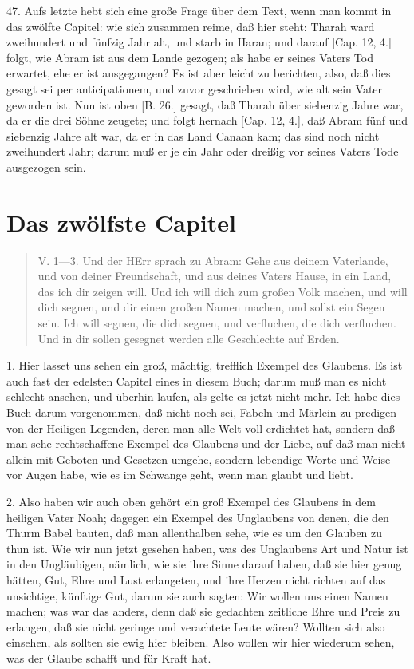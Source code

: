 47. Aufs letzte hebt sich eine große Frage über dem Text, wenn man kommt in das zwölfte Capitel: wie sich zusammen reime, daß hier steht: Tharah ward zweihundert und fünfzig Jahr alt, und starb in Haran; und darauf [Cap. 12, 4.] folgt, wie Abram ist aus dem Lande gezogen; als habe er seines Vaters Tod erwartet, ehe er ist ausgegangen? Es ist aber leicht zu berichten, also, daß dies gesagt sei per anticipationem, und zuvor geschrieben wird, wie alt sein Vater geworden ist. Nun ist oben [B. 26.] gesagt, daß Tharah über siebenzig Jahre war, da er die drei Söhne zeugete; und folgt hernach [Cap. 12, 4.], daß Abram fünf und siebenzig Jahre alt war, da er in das Land Canaan kam; das sind noch nicht zweihundert Jahr; darum muß er je ein Jahr oder dreißig vor seines Vaters Tode ausgezogen sein.

\section{Das zwölfste Capitel}

\begin{quote}
V. 1—3. Und der HErr sprach zu Abram: Gehe aus deinem Vaterlande, und von deiner Freundschaft, und aus deines Vaters Hause, in ein Land, das ich dir zeigen will. Und ich will dich zum großen Volk machen, und will dich segnen, und dir einen großen Namen machen, und sollst ein Segen sein. Ich will segnen, die dich segnen, und verfluchen, die dich verfluchen. Und in dir sollen gesegnet werden alle Geschlechte auf Erden.
\end{quote}

1. Hier lasset uns sehen ein groß, mächtig, trefflich Exempel des Glaubens. Es ist auch fast der edelsten Capitel eines in diesem Buch; darum muß man es nicht schlecht ansehen, und überhin laufen, als gelte es jetzt nicht mehr. Ich habe dies Buch darum vorgenommen, daß nicht noch sei, Fabeln und Märlein zu predigen von der Heiligen Legenden, deren man alle Welt voll erdichtet hat, sondern daß man sehe rechtschaffene Exempel des Glaubens und der Liebe, auf daß man nicht allein mit Geboten und Gesetzen umgehe, sondern lebendige Worte und Weise vor Augen habe, wie es im Schwange geht, wenn man glaubt und liebt.

2. Also haben wir auch oben gehört ein groß Exempel des Glaubens in dem heiligen Vater Noah; dagegen ein Exempel des Unglaubens von denen, die den Thurm Babel bauten, daß man allenthalben sehe, wie es um den Glauben zu thun ist. Wie wir nun jetzt gesehen haben, was des Unglaubens Art und Natur ist in den Ungläubigen, nämlich, wie sie ihre Sinne darauf haben, daß sie hier genug hätten, Gut, Ehre und Lust erlangeten, und ihre Herzen nicht richten auf das unsichtige, künftige Gut, darum sie auch sagten: Wir wollen uns einen Namen machen; was war das anders, denn daß sie gedachten zeitliche Ehre und Preis zu erlangen, daß sie nicht geringe und verachtete Leute wären? Wollten sich also einsehen, als sollten sie ewig hier bleiben. Also wollen wir hier wiederum sehen, was der Glaube schafft und für Kraft hat.

